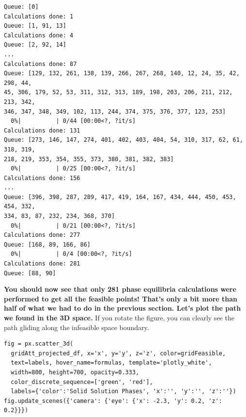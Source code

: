\begin{verbatim}
Queue: [0]
Calculations done: 1
Queue: [1, 91, 13]
Calculations done: 4
Queue: [2, 92, 14]
...
Calculations done: 87
Queue: [129, 132, 261, 138, 139, 266, 267, 268, 140, 12, 24, 35, 42, 298, 44, 
45, 306, 179, 52, 53, 311, 312, 313, 189, 198, 203, 206, 211, 212, 213, 342, 
346, 347, 348, 349, 102, 113, 244, 374, 375, 376, 377, 123, 253]
  0%|          | 0/44 [00:00<?, ?it/s]
Calculations done: 131
Queue: [273, 146, 147, 274, 401, 402, 403, 404, 54, 310, 317, 62, 61, 318, 319, 
218, 219, 353, 354, 355, 373, 380, 381, 382, 383]
  0%|          | 0/25 [00:00<?, ?it/s]
Calculations done: 156
...
Queue: [396, 398, 287, 289, 417, 419, 164, 167, 434, 444, 450, 453, 454, 332, 
334, 83, 87, 232, 234, 368, 370]
  0%|          | 0/21 [00:00<?, ?it/s]
Calculations done: 277
Queue: [168, 89, 166, 86]
  0%|          | 0/4 [00:00<?, ?it/s]
Calculations done: 281
Queue: [88, 90]
\end{verbatim}

\textbf{You should now see that only 281 phase equilibria calculations
were performed to get all the feasible points! That's only a bit more
than half of what we had to do in the previous section. Let's plot the
path we found in the 3D space.} If you rotate the figure, you can
clearly see the path gliding along the infeasible space boundary.

\begin{verbatim}
fig = px.scatter_3d(
  gridAtt_projected_df, x='x', y='y', z='z', color=gridFeasible, 
  text=labels, hover_name=formulas, template='plotly_white', 
  width=800, height=700, opacity=0.333, 
  color_discrete_sequence=['green', 'red'], 
  labels={'color':'Solid Solution Phases', 'x':'', 'y':'', 'z':''})
fig.update_scenes({'camera': {'eye': {'x': -2.3, 'y': 0.2, 'z': 0.2}}})
\end{verbatim}

